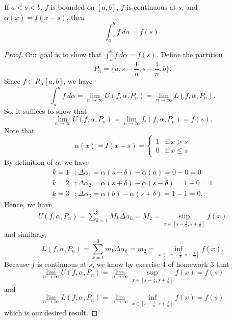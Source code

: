 \documentclass[a4paper]{article}
\begin{document}
\begin{theorem}
    If \( a < s < b  \), \( f   \) is bounded on \( [a,b] \), \( f  \) is continuous at \( s  \), and \( \alpha(x) = I (x-s) \), then
    \[  \int_{ a }^{ b } f \ d \alpha = f(s). \]
\end{theorem}
\begin{proof}
    Our goal is to show that \( \int_{ a }^{ b } f  \ d \alpha = f(s) \).     Define the partition
\[  {P}_{n} = \Big\{ a , s - \frac{ 1 }{ n } , s + \frac{ 1 }{ n } , b \Big\}.  \]
Since \( f \in R_{\alpha}[a,b] \), we have 
\[  \int_{ a }^{ b } f \ d \alpha = \lim_{ n \to \infty  } U(f, \alpha, {P}_{n}) = \lim_{ n \to \infty  }  L(f, \alpha, {P}_{n}). \tag{*} \]
    So, it suffices to show that 
    \[  \lim_{ n \to \infty  }  U(f, \alpha, {P}_{n}) = \lim_{ n \to \infty  }  L(f, \alpha, {P}_{n}) =  f(s). \]
Note that 
\[  \alpha(x) = I(x-s) = 
\begin{cases}
    1 &\text{if} \ x > s \\
    0 &\text{if} \ x \leq s 
\end{cases}  \]
By definition of \( \alpha \), we have 
\begin{align*}
    k = 1 &; \Delta {\alpha}_{1} = \alpha(s- \delta) - \alpha(a) = 0 - 0 = 0  \\
    k = 2 &; \Delta \alpha_2 = \alpha(s + \delta) - \alpha(s - \delta) = 1 - 0 =  1 \\
    k = 3 &; \Delta {\alpha}_{3} =  \alpha(b) - \alpha(s+\delta) = 1- 1 = 0. 
\end{align*}
Hence, we have 
\begin{align*} U(f, \alpha, {P}_{n}) = \sum_{ k=1  }^{ 3  } {M}_{k} \Delta {\alpha}_{k} 
                          = {M}_{2}
                          = \sup_{x \in [s - \frac{ 1 }{ n } , s + \frac{ 1 }{ n } ]} f(x)
\end{align*} 
and similarly, 
\[  L(f, \alpha, {P}_{n})  = \sum_{ k=1  }^{ 3  } {m}_{k} \Delta {\alpha}_{k} = {m}_{2} = \inf_{x \in [s - \frac{ 1 }{ n } , s + \frac{ 1 }{ n } ]} f(x). \]
Because \( f  \) is continuous at \( s  \), we know by exercise 4 of homework 3 that
\[  \lim_{ n \to \infty  }  U(f, \alpha, {P}_{n}) = \lim_{ n \to \infty  }  \sup_{x \in [s - \frac{ 1 }{ n }  , s  + \frac{ 1 }{ n } ]} f(x) = f(s) \]
and 
\[  \lim_{ n \to \infty  } L(f,\alpha, {P}_{n}) = \lim_{ n \to \infty  } \inf_{x \in [s - \frac{ 1 }{ n } , s+ \frac{ 1 }{ n } ]} f(x) = f(s) \]
which is our desired result.
\end{proof} 
\end{document}
